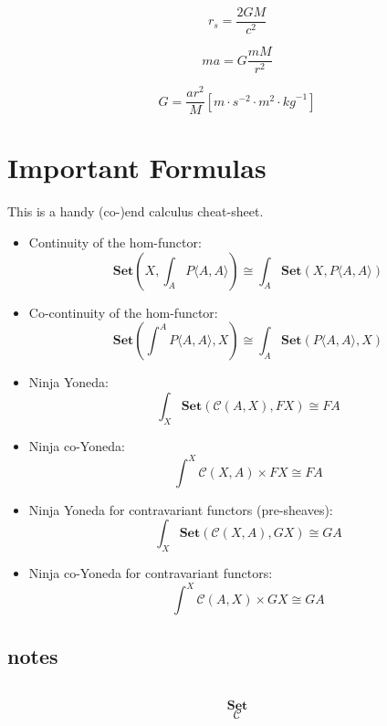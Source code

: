\documentclass[DaoFP]{subfiles}
\begin{document}
\[ r_s = \frac{2 G M}{c^2} \]

\[ m a = G \frac{m M}{r^2} \]

\[ G = \frac{a r^2}{M} [m\cdot s^{-2} \cdot m^2 \cdot \mathit{kg}^{-1}]\]

\section{Important Formulas}
This is a handy (co-)end calculus cheat-sheet.
\begin{itemize}
\item Continuity of the hom-functor:
\[ \mathbf{Set}\left(X, \int_A P\langle A, A \rangle \right) \cong \int_A  \mathbf{Set}(X, P\langle A, A \rangle) \]
\item Co-continuity of the hom-functor:
\[ \mathbf{Set}\left( \int^A P\langle A, A \rangle , X\right) \cong \int_A  \mathbf{Set}(P\langle A, A \rangle, X) \]
\item Ninja Yoneda:
\[ \int_{X} \mathbf{Set} (\mathcal{C}(A, X), FX) \cong FA \]
\item Ninja co-Yoneda:
\[ \int^{X} \mathcal{C}(X, A) \times F X \cong F A \]
\item Ninja Yoneda for contravariant functors (pre-sheaves):
\[ \int_{X} \mathbf{Set} (\mathcal{C}(X, A), GX) \cong GA \]
\item Ninja co-Yoneda for contravariant functors:
\[ \int^{X} \mathcal{C}(A, X) \times G X \cong G A \]
\end{itemize}


\subsection{notes}

\begin{exercise}
\end{exercise}

\begin{haskell}
\end{haskell}

\[
 \begin{tikzcd}
  \end{tikzcd}
\]

\[   \mathbf{Set} \]
\[   \mathcal{C} \]
\end{document}
